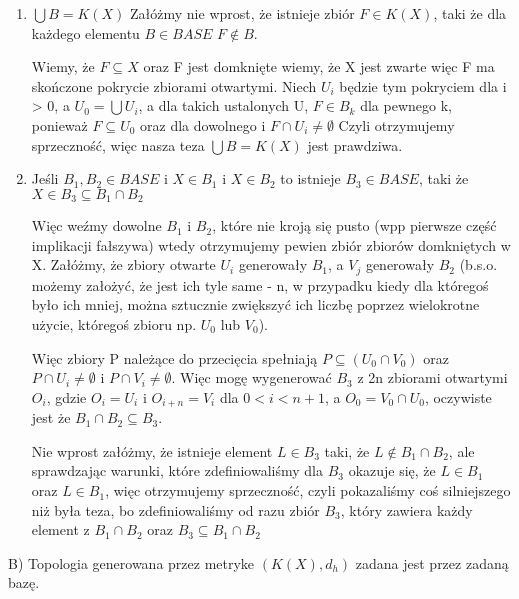 \documentclass[12pt,a4paper]{article}
\begin{document}
\begin{enumerate}
    \item $\bigcup B = K(X)$
    Załóżmy nie wprost, że istnieje zbiór $F \in K(X)$, taki że dla każdego elementu $B \in BASE$ $F \notin B$.
    
    Wiemy, że $F \subseteq X$ oraz F jest domknięte wiemy, że X jest zwarte więc F ma skończone pokrycie zbiorami otwartymi. Niech $U_i$ będzie tym pokryciem dla i > 0, a $U_0 = \bigcup U_i$, a dla takich ustalonych U, $F \in B_k$ dla pewnego k, ponieważ $F \subseteq U_0$ oraz dla dowolnego i $F \cap U_i \neq \emptyset$ Czyli otrzymujemy sprzeczność, więc nasza teza $\bigcup B = K(X)$ jest prawdziwa.
    
    \item Jeśli $B_1, B_2 \in BASE$ i $X \in B_1$ i $X \in B_2$ to istnieje $B_3 \in BASE$, taki że $X \in B_3 \subseteq B_1 \cap B_2$
    
    Więc weźmy dowolne $B_1$ i $B_2$, które nie kroją się pusto (wpp pierwsze część implikacji fałszywa) wtedy otrzymujemy pewien zbiór zbiorów domkniętych w X. Załóżmy, że zbiory otwarte $U_i$ generowały $B_1$, a $V_j$ generowały $B_2$ (b.s.o. możemy założyć, że jest ich tyle same - n, w przypadku kiedy dla któregoś było ich mniej, można sztucznie zwiększyć ich liczbę poprzez wielokrotne użycie, któregoś zbioru np. $U_0$ lub $V_0$). 
    
    Więc zbiory P należące do przecięcia spełniają $P \subseteq (U_0 \cap V_0)$ oraz $P \cap U_i \neq \emptyset$ i $P \cap V_i \neq \emptyset$. Więc mogę wygenerować $B_3$ z 2n zbiorami otwartymi $O_i$, gdzie $O_i = U_i$ i $O_{i+n} = V_i$ dla $0< i <n+1$, a $O_0 = V_0 \cap U_0$, oczywiste jest że $B_1 \cap B_2 \subseteq B_3$.
    
    Nie wprost załóżmy, że istnieje element $L \in B_3$ taki, że $L \notin B_1 \cap B_2$, ale sprawdzając warunki, które zdefiniowaliśmy dla $B_3$ okazuje się, że $L \in B_1$ oraz $L \in B_1$, więc otrzymujemy sprzeczność, czyli pokazaliśmy coś silniejszego niż była teza, bo zdefiniowaliśmy od razu zbiór $B_3$, który zawiera każdy element z $B_1 \cap B_2$ oraz $B_3 \subseteq B_1 \cap B_2$
\end{enumerate}

B) Topologia generowana przez metryke $(K(X), d_h)$ zadana jest przez zadaną bazę.
\end{document}
